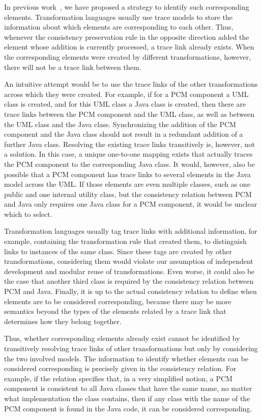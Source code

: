 In previous work~, we have proposed a strategy to identify such corresponding elements.
Transformation languages usually use trace models to store the information about which elements are corresponding to each other.
Thus, whenever the consistency preservation rule in the opposite direction added the element whose addition is currently processed, a trace link already exists.
When the corresponding elements were created by different transformations, however, there will not be a trace link between them.

An intuitive attempt would be to use the trace links of the other transformations across which they were created.
For example, if for a \gls{PCM} component a \gls{UML} class is created, and for this \gls{UML} class a Java class is created, then there are trace links between the \gls{PCM} component and the \gls{UML} class, as well as between the \gls{UML} class and the Java class.
Synchronizing the addition of the \gls{PCM} component and the Java class should not result in a redundant addition of a further Java class.
Resolving the existing trace links transitively is, however, not a solution.
In this case, a unique one-to-one mapping exists that actually traces the \gls{PCM} component to the corresponding Java class.
It would, however, also be possible that a \gls{PCM} component has trace links to several elements in the Java model across the \gls{UML}.
If those elements are even multiple classes, such as one public and one internal utility class, but the consistency relation between \gls{PCM} and Java only requires one Java class for a \gls{PCM} component, it would be unclear which to select.

Transformation languages usually tag trace links with additional information, for example, containing the transformation rule that created them, to distinguish links to instances of the same class.
Since these tags are created by other transformations, considering them would violate our assumption of independent development and modular reuse of transformations.
Even worse, it could also be the case that another third class is required by the consistency relation between \gls{PCM} and Java.
Finally, it is up to the actual consistency relation to define when elements are to be considered corresponding, because there may be more semantics beyond the types of the elements related by a trace link that determines how they belong together.

Thus, whether corresponding elements already exist cannot be identified by transitively resolving trace links of other transformations but only by considering the two involved models.
The information to identify whether elements can be considered corresponding is precisely given in the consistency relation.
For example, if the relation specifies that, in a very simplified notion, a \gls{PCM} component is consistent to all Java classes that have the same name, no matter what implementation the class contains, then if any class with the name of the \gls{PCM} component is found in the Java code, it can be considered corresponding.

